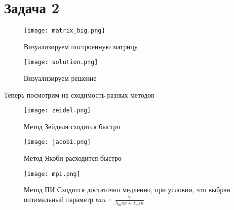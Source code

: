 \documentclass{llncs}
\begin{document}
\section{ Задача 2}
	
	\begin{figure}[]
	\centering
	\texttt{[image: matrix\_big.png]}
	\caption{ Визуализируем построенную матрицу}
\end{figure}
	
	
	\begin{figure}[]
	\centering
	\texttt{[image: solution.png]}
	\caption{Визуализируем решение}
\end{figure}

\newpage
Теперь посмотрим на сходимость разных методов
\begin{figure}[]
	\centering
	\texttt{[image: zeidel.png]}
	\caption{Метод Зейделя сходится быстро}
\end{figure}


\begin{figure}[]
	\centering
	\texttt{[image: jacobi.png]}
	\caption{Метод Якоби расходится быстро}
\end{figure}


\begin{figure}[]
	\centering
	\texttt{[image: mpi.png]}
	\caption{
Метод ПИ Сходится достаточно медленно, при условии, что выбран оптимальный параметр $tau = \frac{2}{\lambda_max + \lambda_min}$}
\end{figure}
\end{document}
